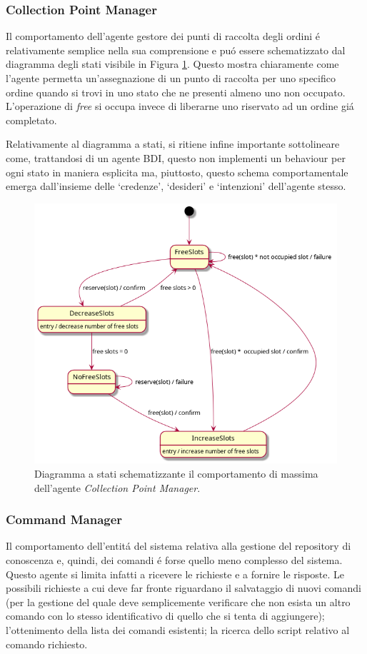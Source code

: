 \subsubsection{Collection Point Manager}
Il comportamento dell'agente gestore dei punti di raccolta degli ordini \'e relativamente semplice nella sua comprensione e pu\'o essere schematizzato dal diagramma degli stati visibile in Figura \ref{fig:state-diagram-cpm}. Questo mostra chiaramente come l'agente permetta un'assegnazione di un punto di raccolta per uno specifico ordine quando si trovi in uno stato che ne presenti almeno uno non occupato. L'operazione di \textit{free} si occupa invece di liberarne uno riservato ad un ordine gi\'a completato.

\parag
Relativamente al diagramma a stati, si ritiene infine importante sottolineare come, trattandosi di un agente BDI, questo non implementi un behaviour per ogni stato in maniera esplicita ma, piuttosto, questo schema comportamentale emerga dall'insieme delle `credenze', `desideri' e `intenzioni' dell'agente stesso.
\begin{figure}[!ht]\centering
    \includegraphics[width=\textwidth]{section/design/figure/collection_point_manager/state_diagram.png}
    \caption{Diagramma a stati schematizzante il comportamento di massima dell'agente \textit{Collection Point Manager}.}
    \label{fig:state-diagram-cpm}
\end{figure}

\subsubsection{Command Manager}
Il comportamento dell'entit\'a del sistema relativa alla gestione del repository di conoscenza e, quindi, dei comandi \'e forse quello meno complesso del sistema. Questo agente si limita infatti a ricevere le richieste e a fornire le risposte. Le possibili richieste a cui deve far fronte riguardano il salvataggio di nuovi comandi (per la gestione del quale deve semplicemente verificare che non esista un altro comando con lo stesso identificativo di quello che si tenta di aggiungere); l'ottenimento della lista dei comandi esistenti; la ricerca dello script relativo al comando richiesto.

